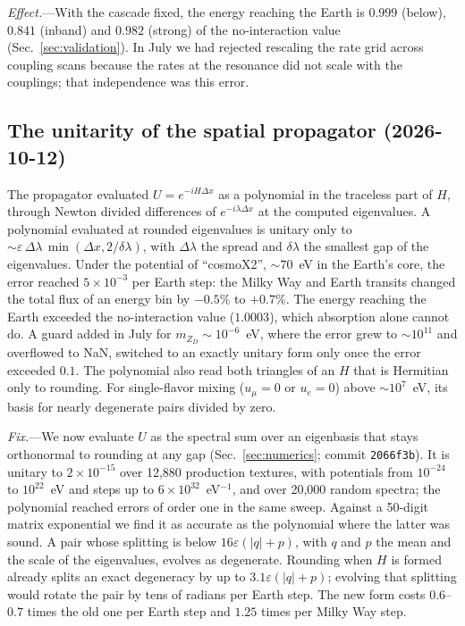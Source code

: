 \documentclass[11pt,a4paper]{article}
\newcommand{\mzd}{m_{Z_D}}
\begin{document}
\textit{Effect.}---With the cascade fixed, the energy reaching the Earth is $0.999$ (below),
$0.841$ (inband) and $0.982$ (strong) of the no-interaction value (Sec.~\ref{sec:validation}). In
July we had rejected rescaling the rate grid across coupling scans because the rates at the
resonance did not scale with the couplings; that independence was this error.

\subsection{The unitarity of the spatial propagator (2026-10-12)}
\label{app:unitarity}

The propagator evaluated $U = e^{-iH\Delta x}$ as a polynomial in the traceless part of $H$,
through Newton divided differences of $e^{-i\lambda\Delta x}$ at the computed eigenvalues. A
polynomial evaluated at rounded eigenvalues is unitary only to
$\sim\varepsilon\,\Delta\lambda\,\min(\Delta x, 2/\delta\lambda)$, with $\Delta\lambda$ the spread
and $\delta\lambda$ the smallest gap of the eigenvalues. Under the potential of ``cosmoX2'',
$\sim70$~eV in the Earth's core, the error reached $5\times10^{-3}$ per Earth step: the Milky Way
and Earth transits changed the total flux of an energy bin by $-0.5\%$ to $+0.7\%$. The energy
reaching the Earth exceeded the no-interaction value ($1.0003$), which absorption alone cannot do.
A guard added in July for $\mzd\sim10^{-6}$~eV, where the error grew to $\sim10^{11}$ and
overflowed to NaN, switched to an exactly unitary form only once the error exceeded $0.1$. The
polynomial also read both triangles of an $H$ that is Hermitian only to rounding. For
single-flavor mixing ($u_\mu = 0$ or $u_e = 0$) above $\sim10^7$~eV, its basis for nearly
degenerate pairs divided by zero.

\textit{Fix.}---We now evaluate $U$ as the spectral sum over an eigenbasis that stays orthonormal
to rounding at any gap (Sec.~\ref{sec:numerics}; commit \texttt{2066f3b}). It is unitary to
$2\times10^{-15}$ over 12,880 production textures, with potentials from $10^{-24}$ to $10^{22}$~eV
and steps up to $6\times10^{32}$~eV$^{-1}$, and over 20,000 random spectra; the polynomial reached
errors of order one in the same sweep. Against a 50-digit matrix exponential we find it as
accurate as the polynomial where the latter was sound. A pair whose splitting is below
$16\varepsilon(|q|+p)$, with $q$ and $p$ the mean and the scale of the eigenvalues, evolves as
degenerate. Rounding when $H$ is formed already splits an exact degeneracy by up to
$3.1\varepsilon(|q|+p)$; evolving that splitting would rotate the pair by tens of radians per
Earth step. The new form costs $0.6$--$0.7$ times the old one per Earth step and $1.25$ times per
Milky Way step.
\end{document}
